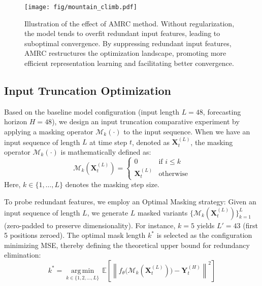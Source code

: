 \documentclass{article}
\begin{document}
\begin{figure}[h]
    \centering
    \texttt{[image: fig/mountain\_climb.pdf]}
    \caption{Illustration of the effect of AMRC method. Without regularization, the model tends to overfit redundant input features, leading to suboptimal convergence. By suppressing redundant input features, AMRC restructures the optimization landscape, promoting more efficient representation learning and facilitating better convergence.}
    \label{fig:mount}
\end{figure}

\subsection{Input Truncation Optimization}
\label{Truncation}
Based on the baseline model configuration (input length \( L = 48 \), forecasting horizon \( H = 48 \)), we design an input truncation comparative experiment by applying a masking operator \( \mathcal{M}_k(\cdot) \) to the input sequence. When we have an input sequence of length $L$ at time step $t$, denoted as $\boldsymbol{X}_t^{(L)}$, the masking operator $\mathcal{M}_k(\cdot)$ is mathematically defined as:
\begin{equation}
\mathcal{M}_k(\boldsymbol{X}^{(L)}_t) = 
\begin{cases} 
0 & \text{if } i \leq k \\
\boldsymbol{X}^{(L)}_t & \text{otherwise}
\end{cases}
\end{equation}
Here, \( k \in \{1, \ldots, L\} \) denotes the masking step size. 

To probe redundant features, we employ an Optimal Masking strategy: Given an input sequence of length $L$, we generate $L$ masked variants $\{\mathcal{M}_k(\boldsymbol{X}_t^{(L)})\}_{k=1}^L$ (zero-padded to preserve dimensionality). For instance, $k=5$ yields $L'=43$ (first 5 positions zeroed). The optimal mask length $k^*$ is selected as the configuration minimizing MSE, thereby defining the theoretical upper bound for redundancy elimination:
\begin{equation}
k^* = \operatorname*{arg\,min}_{k \in \{1, 2, \ldots, L\}} \, \mathbb{E} \left[ \left\| f_\theta \big( \mathcal{M}_k( \boldsymbol{X}^{(L)}_t ) \big) - \boldsymbol{Y}^{(H)}_t \right\|^2 \right]
\end{equation}
\end{document}
